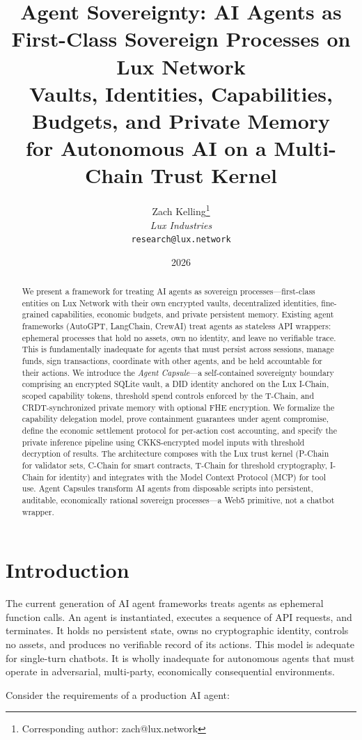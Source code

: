 \documentclass[11pt,a4paper]{article}
\title{\textbf{Agent Sovereignty: AI Agents as First-Class Sovereign Processes on Lux Network}\\[6pt]
\large Vaults, Identities, Capabilities, Budgets, and Private Memory\\for Autonomous AI on a Multi-Chain Trust Kernel}
\author{
Zach Kelling\thanks{Corresponding author: zach@lux.network}\\
\textit{Lux Industries}\\
\texttt{research@lux.network}
}
\date{2026}
\begin{document}
\luxcoverpage

\begin{abstract}
We present a framework for treating AI agents as sovereign processes---first-class entities on Lux Network with their own encrypted vaults, decentralized identities, fine-grained capabilities, economic budgets, and private persistent memory. Existing agent frameworks (AutoGPT, LangChain, CrewAI) treat agents as stateless API wrappers: ephemeral processes that hold no assets, own no identity, and leave no verifiable trace. This is fundamentally inadequate for agents that must persist across sessions, manage funds, sign transactions, coordinate with other agents, and be held accountable for their actions. We introduce the \emph{Agent Capsule}---a self-contained sovereignty boundary comprising an encrypted SQLite vault, a DID identity anchored on the Lux I-Chain, scoped capability tokens, threshold spend controls enforced by the T-Chain, and CRDT-synchronized private memory with optional FHE encryption. We formalize the capability delegation model, prove containment guarantees under agent compromise, define the economic settlement protocol for per-action cost accounting, and specify the private inference pipeline using CKKS-encrypted model inputs with threshold decryption of results. The architecture composes with the Lux trust kernel (P-Chain for validator sets, C-Chain for smart contracts, T-Chain for threshold cryptography, I-Chain for identity) and integrates with the Model Context Protocol (MCP) for tool use. Agent Capsules transform AI agents from disposable scripts into persistent, auditable, economically rational sovereign processes---a Web5 primitive, not a chatbot wrapper.
\end{abstract}

\section{Introduction}\label{sec:intro}

The current generation of AI agent frameworks treats agents as ephemeral function calls. An agent is instantiated, executes a sequence of API requests, and terminates. It holds no persistent state, owns no cryptographic identity, controls no assets, and produces no verifiable record of its actions. This model is adequate for single-turn chatbots. It is wholly inadequate for autonomous agents that must operate in adversarial, multi-party, economically consequential environments.

Consider the requirements of a production AI agent:
\end{document}
